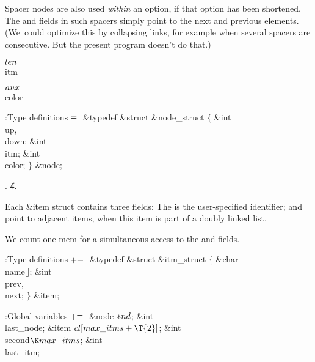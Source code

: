 Spacer nodes are also used {\it within\/} an option, if that option
has been shortened. The  and  fields in such spacers
simply point to the next and previous elements. (We~could optimize
this by collapsing links, for example when several spacers are
consecutive. But the present program doesn't do that.)

\Y\B\4\D$\\{len}$ \5
\\{itm}\par
\B\4\D$\\{aux}$ \5
\\{color}\par
\Y\B\4:Type definitions\X${}\equiv{}$\6
\&{typedef} \&{struct} \&{node\_struct} ${}\{{}$\1\6
\&{int} \\{up}${},{}$ \\{down};\6
\&{int} \\{itm};\6
\&{int} \\{color};\2\6
${}\}{}$ \&{node};\par
{}.
\U4.\fi

Each \&{item} struct contains three fields:
The  is the user-specified identifier;
 and  point to adjacent items, when this
item is part of a doubly linked list.

We count one mem for a simultaneous access to the  and  fields.

\Y\B\4:Type definitions\X${}\mathrel+\equiv{}$\6
\&{typedef} \&{struct} \&{itm\_struct} ${}\{{}$\1\6
\&{char} \\{name}[];\6
\&{int} \\{prev}${},{}$ \\{next};\2\6
${}\}{}$ \&{item};\par
\fi

\B{}:Global variables\X${}\mathrel+\equiv{}$\6
\&{node} ${}{*}\\{nd}{}$;\6
\&{int} \\{last\_node};\6
\&{item} ${}\\{cl}[\\{max\_itms}+\T{2}]{}$;\6
\&{int} \\{second}${}\K\\{max\_itms}{}$;\6
\&{int} \\{last\_itm};%
\par
\fi

